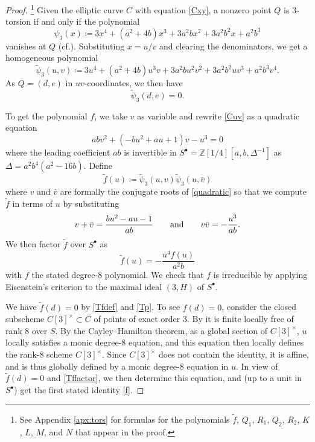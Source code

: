 \documentclass{gtpart}
\theoremstyle{definition}
\theoremstyle{remark}
\newcommand{\mb}[1]{\mathbb{#1}}
\newcommand{\cf}{cf.\thinspace}
\newcommand{\BZ}{{\mb Z}}
\newcommand{\Tf}{\widetilde{f}}
\newcommand{\Tp}{\widetilde{\psi}}
\newcommand{\ad}{{\rm and}}
\newcommand{\s}{S^\bullet}
\begin{document}
\begin{proof}
 \footnote{See Appendix \ref{apx:tors} for formulas for the polynomials $\Tf$, $Q_1$, $R_1$, $Q_2$, $R_2$, $K$, $L$, $M$, and $N$ that appear in the proof.  }
 Given the elliptic curve $C$ with equation \eqref{Cxy}, a nonzero point $Q$ is 3-torsion if and only if the polynomial 
 \[
  \psi_3 (x) \coloneqq 3 x^4 + (a^2 + 4 b) x^3 + 3 a^2 b x^2 + 3 a^2 b^2 x + a^2 b^3 
 \]
 vanishes at $Q$ (\cf \cite[Exercise 3.7f]{AEC}).  Substituting $x = u / v$ and clearing the denominators, we get a homogeneous polynomial 
 \[
  \Tp_3(u,v) \coloneqq 3 u^4 + (a^2 + 4 b) u^3 v + 3 a^2 b u^2 v^2 + 3 a^2 b^2 u v^3 + a^2 b^3 v^4.  
 \]
 As $Q = (d,e)$ in $uv$-coordinates, we then have 
 \begin{equation}
 \label{Tp}
  \Tp_3(d,e) = 0.  
 \end{equation}

 To get the polynomial $f$, we take $v$ as variable and rewrite \eqref{Cuv} as a quadratic equation 
 \begin{equation}
 \label{quadratic}
  a b v^2 + (-b u^2 + a u + 1) v - u^3 = 0 
 \end{equation}
 where the leading coefficient $a b$ is invertible in $\s = \BZ [1/4] [a, b, \Delta^{-1}]$ as $\Delta = a^2 b^4 (a^2 - 16 b)$.  
 Define 
 \begin{equation}
 \label{Tfdef}
  \Tf(u) \coloneqq \Tp_3(u,v) \Tp_3(u,\bar{v}) 
 \end{equation}
 where $v$ and $\bar{v}$ are formally the conjugate roots of \eqref{quadratic} 
 so that we compute $\Tf$ in terms of $u$ by substituting 
 \[
  v + \bar{v} = \frac{b u^2 - a u - 1}{a b} \qquad \ad \qquad v \bar{v} = -\frac{u^3}{a b}.  
 \]
 We then factor $\Tf$ over $\s$ as 
 \begin{equation}
 \label{Tffactor}
  \Tf(u) = -\frac{u^4 f(u)}{a^2 b} 
 \end{equation}
 with $f$ the stated degree-8 polynomial.  
 We check that $f$ is irreducible by applying Eisenstein's criterion to the maximal ideal $(3,H)$ of $\s$.  

 We have $\Tf(d) = 0$ by \eqref{Tfdef} and \eqref{Tp}.  To see $f(d) = 0$, consider the closed subscheme $C[3]^\times \subset C$ of points of exact order 3.  
 By \cite[2.3.1]{KM} it is finite locally free of rank 8 over $S$.  
 By the Cayley--Hamilton theorem, as a global section of $C[3]^\times$, $u$ locally satisfies a monic degree-8 equation, 
 and this equation then locally defines the rank-8 scheme $C[3]^\times$.  
 Since $C[3]^\times$ does not contain the identity, it is affine, and is thus globally defined by a monic degree-8 equation in $u$.  
 In view of $\Tf(d) = 0$ and \eqref{Tffactor}, we then determine this equation, and (up to a unit in $\s$) get the first stated identity \eqref{f}.  


\end{proof}
\end{document}
